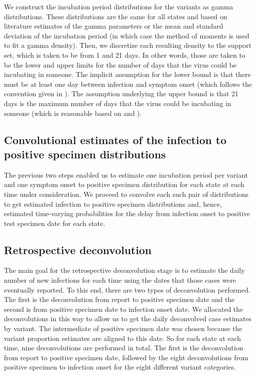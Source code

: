 \documentclass{article}
\begin{document}
We construct the incubation period distributions for the variants as gamma distributions.
These distributions are the same for all states and based on literature estimates of the gamma parameters or the
mean and standard deviation of the incubation period (in which case the method
of moments is used to fit a gamma density). Then, we discretize each
resulting density to the support set, which is taken to be from 1 and
21 days. In other words, those are taken to be the lower and upper limits for
the number of days that the virus could be incubating in someone. The implicit
assumption for the lower bound is that there must be at least one day between
infection and symptom onset (which follows the convention given in
\citealp{phcan2021covid}). The assumption underlying the upper bound is that 21
days is the maximum number of days that the virus could be incubating in someone
(which is reasonable based on \citealp{zaki2021estimations} and
\citealp{cortes2022sars}).

\subsection{Convolutional estimates of the infection to positive specimen distributions} 

The previous two steps enabled us to estimate one incubation period per variant
and one symptom onset to positive specimen distribution for each state at each time under
consideration. We proceed to convolve each such pair of distributions to get estimated
infection to positive specimen distributions and, hence, estimated time-varying probabilities for
the delay from infection onset to positive test specimen date for each state.

\subsection{Retrospective deconvolution}

The main goal for the retrospective deconvolution stage is to estimate the daily number of new
infections for each time using the dates that those cases were eventually
reported. To this end, there are two types of deconvolution performed. The first is the deconvolution from report to positive specimen date and the second is from positive specimen date to infection onset date. We allocated the deconvolutions in this way to allow us to get the daily deconvolved case estimates by variant. The intermediate of positive specimen date was chosen because the variant proportion estimates are aligned to this date. So for each state at each time, nine deconvolutions are performed in total. The first is the deconvolution from report to positive specimen date, followed by the eight deconvolutions from positive specimen to infection onset for the eight different variant categories.
\end{document}
